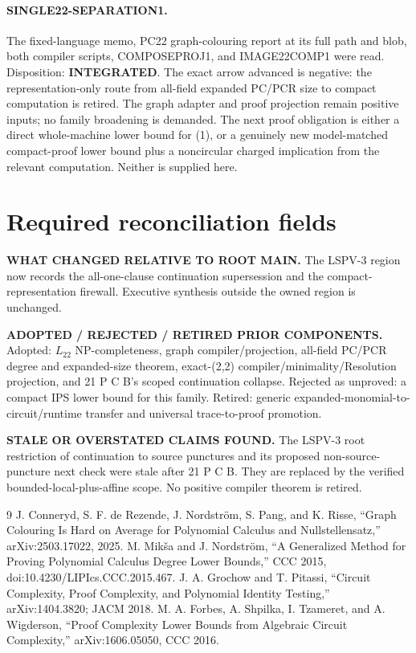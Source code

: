 \documentclass[11pt]{article}
\begin{document}
\paragraph{SINGLE22-SEPARATION1.}
The fixed-language memo, PC22 graph-colouring report at its full path and
blob, both compiler scripts, COMPOSEPROJ1, and IMAGE22COMP1 were read.
Disposition: \textbf{INTEGRATED}.  The exact arrow advanced is negative:
the representation-only route from all-field expanded PC/PCR size to compact
computation is retired.  The graph adapter and proof projection remain
positive inputs; no family broadening is demanded.  The next proof obligation
is either a direct whole-machine lower bound for (1), or a genuinely new
model-matched compact-proof lower bound plus a noncircular charged implication
from the relevant computation.  Neither is supplied here.

\section{Required reconciliation fields}
\textbf{WHAT CHANGED RELATIVE TO ROOT MAIN.}
The LSPV-3 region now records the all-one-clause continuation supersession and
the compact-representation firewall.  Executive synthesis outside the owned
region is unchanged.

\textbf{ADOPTED / REJECTED / RETIRED PRIOR COMPONENTS.}
Adopted: $L_{22}$ NP-completeness, graph compiler/projection, all-field PC/PCR
degree and expanded-size theorem, exact-(2,2) compiler/minimality/Resolution
projection, and 21 P C B's scoped continuation collapse.  Rejected as
unproved: a compact IPS lower bound for this family.  Retired: generic
expanded-monomial-to-circuit/runtime transfer and universal trace-to-proof
promotion.

\textbf{STALE OR OVERSTATED CLAIMS FOUND.}
The LSPV-3 root restriction of continuation to source punctures and its
proposed non-source-puncture next check were stale after 21 P C B.  They are
replaced by the verified bounded-local-plus-affine scope.  No positive
compiler theorem is retired.

\begin{thebibliography}{9}
 J. Conneryd, S. F. de Rezende, J. Nordstr\"om, S. Pang,
and K. Risse, ``Graph Colouring Is Hard on Average for Polynomial Calculus
and Nullstellensatz,'' arXiv:2503.17022, 2025.
 M. Mik\v{s}a and J. Nordstr\"om, ``A Generalized Method for
Proving Polynomial Calculus Degree Lower Bounds,'' CCC 2015,
doi:10.4230/LIPIcs.CCC.2015.467.
 J. A. Grochow and T. Pitassi, ``Circuit Complexity, Proof
Complexity, and Polynomial Identity Testing,'' arXiv:1404.3820; JACM 2018.
 M. A. Forbes, A. Shpilka, I. Tzameret, and A. Wigderson,
``Proof Complexity Lower Bounds from Algebraic Circuit Complexity,''
arXiv:1606.05050, CCC 2016.
\end{thebibliography}
\end{document}
